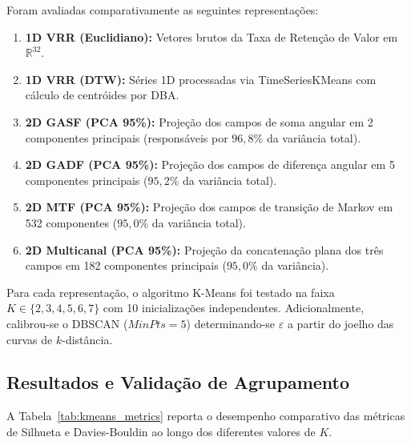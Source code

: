 Foram avaliadas comparativamente as seguintes representações:
\begin{enumerate}
    \item \textbf{1D VRR (Euclidiano):} Vetores brutos da Taxa de Retenção de Valor em $\mathbb{R}^{32}$.
    \item \textbf{1D VRR (DTW):} Séries 1D processadas via TimeSeriesKMeans com cálculo de centróides por DBA.
    \item \textbf{2D GASF (PCA 95\%):} Projeção dos campos de soma angular em 2 componentes principais (responsáveis por $96{,}8\%$ da variância total).
    \item \textbf{2D GADF (PCA 95\%):} Projeção dos campos de diferença angular em 5 componentes principais ($95{,}2\%$ da variância total).
    \item \textbf{2D MTF (PCA 95\%):} Projeção dos campos de transição de Markov em 532 componentes ($95{,}0\%$ da variância total).
    \item \textbf{2D Multicanal (PCA 95\%):} Projeção da concatenação plana dos três campos em 182 componentes principais ($95{,}0\%$ da variância).
\end{enumerate}

Para cada representação, o algoritmo K-Means foi testado na faixa $K \in \{2, 3, 4, 5, 6, 7\}$ com 10 inicializações independentes. Adicionalmente, calibrou-se o DBSCAN ($MinPts = 5$) determinando-se $\varepsilon$ a partir do joelho das curvas de $k$-distância.

\subsection{Resultados e Validação de Agrupamento}

A Tabela~\ref{tab:kmeans_metrics} reporta o desempenho comparativo das métricas de Silhueta e Davies-Bouldin ao longo dos diferentes valores de $K$.

